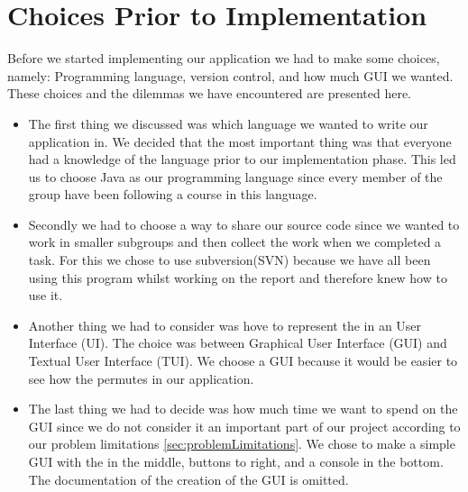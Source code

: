 \chapter{Choices Prior to Implementation}
Before we started implementing our application we had to make some choices, namely: Programming language, version control, and how much GUI we wanted.
These choices and the dilemmas we have encountered are presented here.

\begin{itemize}
	\item The first thing we discussed was which language we wanted to write our application in.
We decided that the most important thing was that everyone had a knowledge of the language prior to our implementation phase.
This led us to choose Java as our programming language since every member of the group have been following a course in this language.

	\item Secondly we had to choose a way to share our source code since we wanted to work in smaller subgroups and then collect the work when we completed a task.
For this we chose to use subversion(SVN) because we have all been using this program whilst working on the report and therefore knew how to use it.

	\item Another thing we had to consider was hove to represent the \rubik{} in an User Interface (UI). The choice was between Graphical User Interface (GUI) and Textual User Interface (TUI). We choose a GUI because it would be easier to see how the \rubik{} permutes in our application.  
	\item The last thing we had to decide was how much time we want to spend on the GUI since we do not consider it an important part of our project according to our problem limitations \ref{sec:problemLimitations}.
We chose to make a simple GUI with the \rubik{} in the middle, buttons to right, and a console in the bottom.
The documentation of the creation of the GUI is omitted.
\end{itemize}
